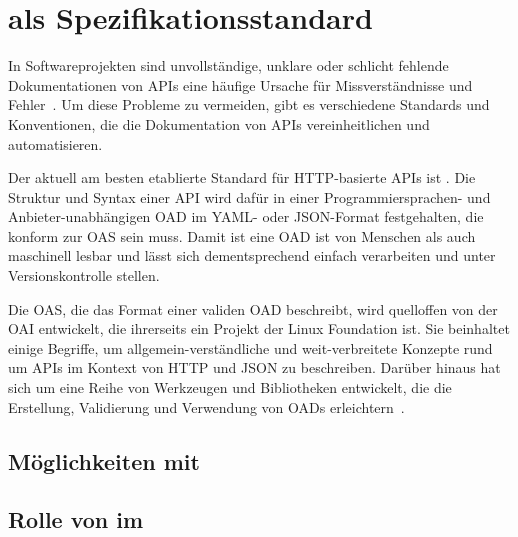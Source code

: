 \chapter{\OA als Spezifikationsstandard}
In Softwareprojekten sind unvollständige, unklare oder schlicht fehlende Dokumentationen von \acp{API} eine häufige Ursache für Missverständnisse und Fehler~\cite{ope23a}.
Um diese Probleme zu vermeiden, gibt es verschiedene Standards und Konventionen, die die Dokumentation von \acp{API} vereinheitlichen und automatisieren.

Der aktuell am besten etablierte Standard für \ac{HTTP}-basierte \acp{API} ist \OA.
Die Struktur und Syntax einer \ac{API} wird dafür in einer Programmiersprachen- und Anbieter-unabhängigen \ac{OAD} im \acs{YAML}- oder \acs{JSON}-Format festgehalten, die konform zur \ac{OAS} sein muss.
Damit ist eine \ac{OAD} ist von Menschen als auch maschinell lesbar und lässt sich dementsprechend  einfach verarbeiten und unter Versionskontrolle stellen.

Die \ac{OAS}, die das Format einer validen \ac{OAD} beschreibt, wird quelloffen von der \ac{OAI} entwickelt, die ihrerseits ein Projekt der Linux Foundation ist.
Sie beinhaltet einige Begriffe, um allgemein-verständliche und weit-verbreitete Konzepte rund um \acp{API} im Kontext von \acs{HTTP} und \acs{JSON} zu beschreiben.
Darüber hinaus hat sich um \OA eine Reihe von Werkzeugen und Bibliotheken entwickelt, die die Erstellung, Validierung und Verwendung von \acp{OAD} erleichtern~\cites{ope,ope23,ope23a}.

\section{Möglichkeiten mit \OA}

\section{Rolle von \OA im \AFA}

